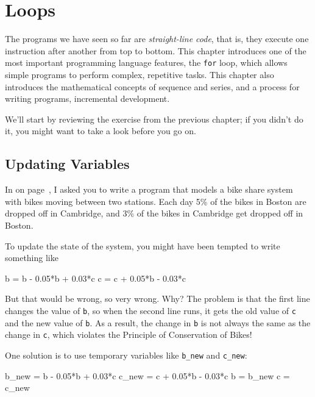 
\chapter{Loops}
\label{loops}

The programs we have seen so far are {\it straight-line code}, that is, they execute one instruction after another from top to bottom.
This chapter introduces one of the most important programming language features, the \lstinline{for} loop, which allows simple programs to perform complex, repetitive tasks. This chapter also introduces the mathematical concepts of sequence and series, and a process for writing programs, incremental development. 

We'll start by reviewing the exercise from the previous chapter; if you didn't do it, you might want to take a look before you go on.

\section{Updating Variables}

In  on page~\pageref{bikegame}, I asked you to write a program that models a bike share system with bikes moving between two stations.
Each day 5\% of the bikes in Boston are dropped off in Cambridge, and 3\% of the bikes
in Cambridge get dropped off in Boston.

To update the state of the system, you might have been tempted to write something
like


\begin{code}
b = b - 0.05*b + 0.03*c
c = c + 0.05*b - 0.03*c
\end{code}

But that would be wrong, so very wrong.  Why?  The problem is that
the first line changes the value of \lstinline{b}, so when the second line
runs, it gets the old value of \lstinline{c} and the new value of \lstinline{b}.
As a result, the change in \lstinline{b} is not always the same as the
change in \lstinline{c}, which violates the Principle of Conservation
of Bikes!

One solution is to use temporary variables like \lstinline{b_new} and \lstinline{c_new}:

\begin{code}
b_new = b - 0.05*b + 0.03*c
c_new = c + 0.05*b - 0.03*c
b = b_new
c = c_new
\end{code}


